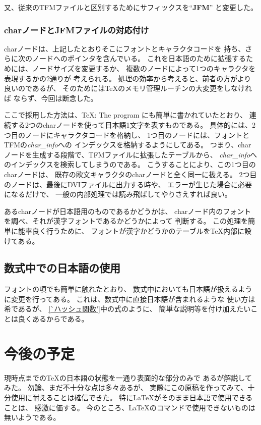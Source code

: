 又、従来のTFMファイルと区別するためにサフィックスを``{\bf JFM}''
と変更した。
%
\subsubsection{charノードとJFMファイルの対応付け}
charノードは、上記したとおりそこにフォントとキャラクタコードを
持ち、さらに次のノードへのポインタを含んでいる。
これを日本語のために拡張するためには、ノードサイズを変更するか、
複数のノードによって1つのキャラクタを表現するかの2通りが
考えられる。
処理の効率から考えると、前者の方がより良いのであるが、
そのためには\TeX のメモリ管理ルーチンの大変更をしなければ
ならず、今回は断念した。

ここで採用した方法は、\TeX : The program にも簡単に書かれていたとおり、
連続する2つのcharノードを使って日本語1文字を表すものである。
具体的には、2つ目のノードにキャラクタコードを格納し、
1つ目のノードには、フォントとTFMの{\it char\_info}への
インデックスを格納するようにしてある。
つまり、charノードを生成する段階で、TFMファイルに拡張したテーブルから、
{\it char\_info}へのインデックスを検索してしまうのである。
こうすることにより、この1つ目のcharノードは、
既存の欧文キャラクタのcharノードと全く同一に扱える。
2つ目のノードは、最後にDVIファイルに出力する時や、
エラーが生じた場合に必要になるだけで、
一般の内部処理では読み飛ばしてやりさえすれば良い。

あるcharノードが日本語用のものであるかどうかは、
charノード内のフォントを調べ、それが漢字フォントであるかどうかによって
判断する。
この処理を簡単に能率良く行うために、
フォントが漢字かどうかのテーブルを\TeX 内部に設けてある。
%
\subsection{数式中での日本語の使用}
フォントの項でも簡単に触れたとおり、
数式中においても日本語が扱えるように変更を行ってある。
これは、数式中に直接日本語が含まれるような
使い方は希であるが、
\ref{`ハッシュ関数'}中の式のように、
簡単な説明等を付け加えたいことは良くあるからである。
%
\newpage
\section{今後の予定}
現時点までの\TeX の日本語の状態を一通り表面的な部分のみで
あるが解説してみた。
勿論、まだ不十分な点は多々あるが、
実際にこの原稿を作ってみて、十分使用に耐えることは確信できた。
特に\LaTeX がそのまま日本語で使用できることは、
感激に価する。
今のところ、\LaTeX のコマンドで使用できないものは無いようである。


